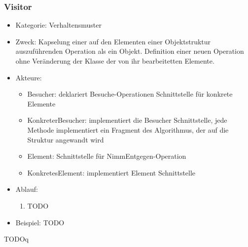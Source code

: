\documentclass[11pt, fleqn, a4paper, leqno]{scrartcl} %
\begin{document}
		\subsubsection{Visitor}
			\begin{itemize}
				\item Kategorie: Verhaltensmuster
				\item Zweck: Kapselung einer auf den Elementen einer Objektstruktur auszuführenden Operation als ein Objekt. Definition einer neuen Operation ohne Veränderung der Klasse der von ihr bearbeitetten Elemente.
				\item Akteure: 
					\begin{itemize}
						\item Besucher: deklariert Besuche-Operationen Schnittstelle für konkrete Elemente
						\item KonkreterBesucher: implementiert die Besucher Schnittstelle, jede Methode implementiert ein Fragment des Algorithmus, der auf die Struktur angewandt wird
						\item Element: Schnittstelle für NimmEntgegen-Operation
						\item KonkretesElement: implementiert Element Schnittstelle
					\end{itemize}
				\item Ablauf:
					\begin{enumerate}
						\item TODO
					\end{enumerate}
				\item Beispiel:	 TODO		
			\end{itemize}
			TODOq
			\newpage
\end{document}
